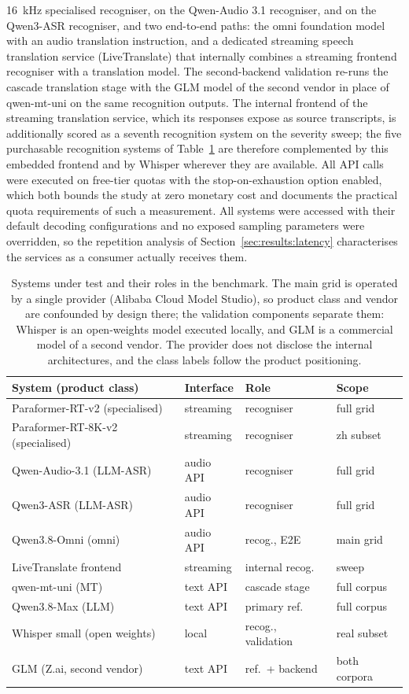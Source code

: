 16~kHz specialised recogniser, on the Qwen-Audio 3.1 recogniser, and on the
Qwen3-ASR recogniser, and two
end-to-end paths: the omni foundation model with an audio translation
instruction, and a dedicated streaming speech translation service
(LiveTranslate) that internally combines a streaming frontend recogniser
with a translation model. The second-backend validation re-runs the cascade
translation stage with the GLM model of the second vendor in place of
qwen-mt-uni on the same
recognition outputs. The internal frontend of the streaming translation
service, which its responses expose as source transcripts, is additionally
scored as a seventh recognition system on the severity sweep; the five
purchasable recognition systems of Table~\ref{tab:systems} are therefore
complemented by this embedded frontend and by Whisper wherever they are
available. All API calls were executed on
free-tier quotas with the stop-on-exhaustion option enabled, which both
bounds the study at zero monetary cost and documents the practical quota
requirements of such a measurement. All systems were accessed with their
default decoding configurations and no exposed sampling parameters were
overridden, so the repetition analysis of Section~\ref{sec:results:latency}
characterises the services as a consumer actually receives them.

\begin{table}[t]
\centering
\caption{Systems under test and their roles in the benchmark. The main grid
is operated by a single provider (Alibaba Cloud Model Studio), so product
class and vendor are confounded by design there; the validation components
separate them: Whisper is an open-weights model executed locally, and GLM is
a commercial model of a second vendor. The provider does not disclose
the internal architectures, and the class labels follow the product
positioning.}
\label{tab:systems}
\footnotesize
\setlength{\tabcolsep}{4pt}
\begin{tabular}{llll}
\toprule
System (product class) & Interface & Role & Scope \\
\midrule
Paraformer-RT-v2 (specialised) & streaming & recogniser & full grid \\
Paraformer-RT-8K-v2 (specialised) & streaming & recogniser & zh subset \\
Qwen-Audio-3.1 (LLM-ASR) & audio API & recogniser & full grid \\
Qwen3-ASR (LLM-ASR) & audio API & recogniser & full grid \\
Qwen3.8-Omni (omni) & audio API & recog., E2E & main grid \\
LiveTranslate frontend & streaming & internal recog. & sweep \\
qwen-mt-uni (MT) & text API & cascade stage & full corpus \\
Qwen3.8-Max (LLM) & text API & primary ref. & full corpus \\
\midrule
Whisper small (open weights) & local & recog., validation & real subset \\
GLM (Z.ai, second vendor) & text API & ref.\ + backend & both corpora \\
\bottomrule
\end{tabular}
\end{table}

